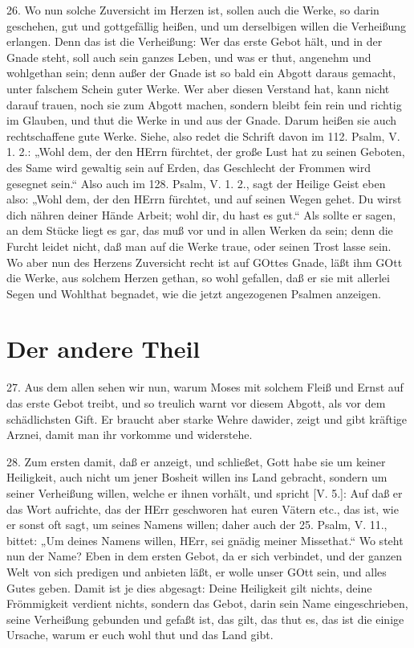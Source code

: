 26. Wo nun solche Zuversicht im Herzen ist, sollen auch die Werke, so darin geschehen, gut und gottgefällig heißen, und um derselbigen willen die Verheißung erlangen. Denn das ist die Verheißung: Wer das erste Gebot hält, und in der Gnade steht, soll auch sein ganzes Leben, und was er thut, angenehm und wohlgethan sein; denn außer der Gnade ist so bald ein Abgott daraus gemacht, unter falschem Schein guter Werke. Wer aber diesen Verstand hat, kann nicht darauf trauen, noch sie zum Abgott machen, sondern bleibt fein rein und richtig im Glauben, und thut die Werke in und aus der Gnade. Darum heißen sie auch rechtschaffene gute Werke. Siehe, also redet die Schrift davon im 112. Psalm, V. 1. 2.: „Wohl dem, der den HErrn fürchtet, der große Lust hat zu seinen Geboten, des Same wird gewaltig sein auf Erden, das Geschlecht der Frommen wird gesegnet sein.“ Also auch im 128. Psalm, V. 1. 2., sagt der Heilige Geist eben also: „Wohl dem, der den HErrn fürchtet, und auf seinen Wegen gehet. Du wirst dich nähren deiner Hände Arbeit; wohl dir, du hast es gut.“ Als sollte er sagen, an dem Stücke liegt es gar, das muß vor und in allen Werken da sein; denn die Furcht leidet nicht, daß man auf die Werke traue, oder seinen Trost lasse sein. Wo aber nun des Herzens Zuversicht recht ist auf GOttes Gnade, läßt ihm GOtt die Werke, aus solchem Herzen gethan, so wohl gefallen, daß er sie mit allerlei Segen und Wohlthat begnadet, wie die jetzt angezogenen Psalmen anzeigen.

\section{Der andere Theil}

27. Aus dem allen sehen wir nun, warum Moses mit solchem Fleiß und Ernst auf das erste Gebot treibt, und so treulich warnt vor diesem Abgott, als vor dem schädlichsten Gift. Er braucht aber starke Wehre dawider, zeigt und gibt kräftige Arznei, damit man ihr vorkomme und widerstehe.

28. Zum ersten damit, daß er anzeigt, und schließet, Gott habe sie um keiner Heiligkeit, auch nicht um jener Bosheit willen ins Land gebracht, sondern um seiner Verheißung willen, welche er ihnen vorhält, und spricht [V. 5.]: Auf daß er das Wort aufrichte, das der HErr geschworen hat euren Vätern etc., das ist, wie er sonst oft sagt, um seines Namens willen; daher auch der 25. Psalm, V. 11., bittet: „Um deines Namens willen, HErr, sei gnädig meiner Missethat.“ Wo steht nun der Name? Eben in dem ersten Gebot, da er sich verbindet, und der ganzen Welt von sich predigen und anbieten läßt, er wolle unser GOtt sein, und alles Gutes geben. Damit ist je dies abgesagt: Deine Heiligkeit gilt nichts, deine Frömmigkeit verdient nichts, sondern das Gebot, darin sein Name eingeschrieben, seine Verheißung gebunden und gefaßt ist, das gilt, das thut es, das ist die einige Ursache, warum er euch wohl thut und das Land gibt.

